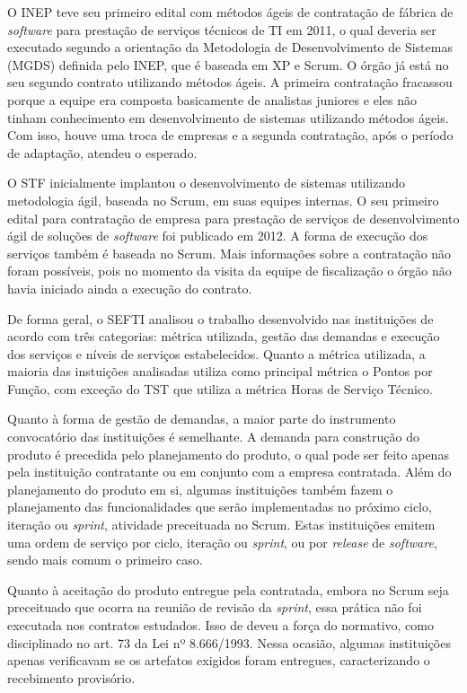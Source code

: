 O INEP teve seu primeiro edital com métodos ágeis de contratação de fábrica de \textit{software} para prestação de serviços técnicos de TI em 2011, o qual deveria ser executado segundo a orientação da Metodologia de Desenvolvimento de Sistemas (MGDS) definida pelo INEP, que é baseada em XP e Scrum. O órgão já está no seu segundo contrato utilizando métodos ágeis. A primeira contratação fracassou porque a equipe era composta basicamente de analistas juniores e eles não tinham conhecimento em desenvolvimento de sistemas utilizando métodos ágeis. Com isso, houve uma troca de empresas e a segunda contratação, após o período de adaptação, atendeu o esperado.

O STF inicialmente implantou o desenvolvimento de sistemas utilizando metodologia ágil, baseada no Scrum, em suas equipes internas. O seu primeiro edital para contratação de empresa para prestação de serviços de desenvolvimento ágil de soluções de \textit{software} foi publicado em 2012. A forma de execução dos serviços também é baseada no Scrum. Mais informações sobre a contratação não foram possíveis, pois no momento da visita da equipe de fiscalização o órgão não havia iniciado ainda a execução do contrato. 

De forma geral, o SEFTI analisou o trabalho desenvolvido nas instituições de acordo com três categorias: métrica utilizada, gestão das demandas e execução dos serviços e níveis de serviços estabelecidos. Quanto a métrica utilizada, a maioria das instuições analisadas utiliza como principal métrica o Pontos por Função, com exceção do TST que utiliza a métrica Horas de Serviço Técnico. 

Quanto à forma de gestão de demandas, a maior parte do instrumento convocatório das instituições é semelhante. A demanda para construção do produto é precedida pelo planejamento do produto, o qual pode ser feito apenas pela instituição contratante ou em conjunto com a empresa contratada. Além do planejamento do produto em si, algumas instituições também fazem o planejamento das funcionalidades que serão implementadas no próximo ciclo, iteração ou \textit{sprint}, atividade preceituada no Scrum. Estas instituições emitem uma ordem de serviço por ciclo, iteração ou \textit{sprint}, ou por \textit{release} de \textit{software}, sendo mais comum o primeiro caso. 

Quanto à aceitação do produto entregue pela contratada, embora no Scrum seja preceituado que ocorra na reunião de revisão da \textit{sprint}, essa prática não foi executada nos contratos estudados. Isso de deveu a força do normativo, como disciplinado no art. 73 da Lei nº 8.666/1993. Nessa ocasião, algumas instituições apenas verificavam se os artefatos exigidos foram entregues, caracterizando o recebimento provisório. 


